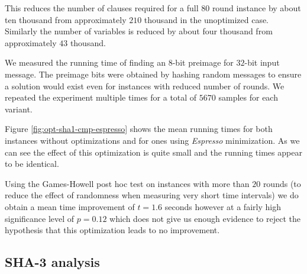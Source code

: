This reduces the number of clauses required for a full $80$ round instance by about ten thousand from approximately $210$ thousand in the unoptimized case.
Similarly the number of variables is reduced by about four thousand from approximately $43$ thousand.

We measured the running time of finding an $8$-bit preimage for $32$-bit input message.
The preimage bits were obtained by hashing random messages to ensure a solution would exist even for instances with reduced number of rounds.
We repeated the experiment multiple times for a total of $5670$ samples for each variant.
 
Figure \ref{fig:opt-sha1-cmp-espresso} shows the mean running times for both instances without optimizations and for ones using \emph{Espresso} minimization.
As we can see the effect of this optimization is quite small and the running times appear to be identical.

%

Using the Games-Howell post hoc test on instances with more than $20$ rounds (to reduce the effect of randomness when measuring very short time intervals) we do obtain a mean time improvement of $t=1.6$ seconds however at a fairly high significance level of $p=0.12$ which does not give us enough evidence to reject the hypothesis that this optimization leads to no improvement.

\subsection{SHA-3 analysis} 
\label{sec:sha3-espresso}


